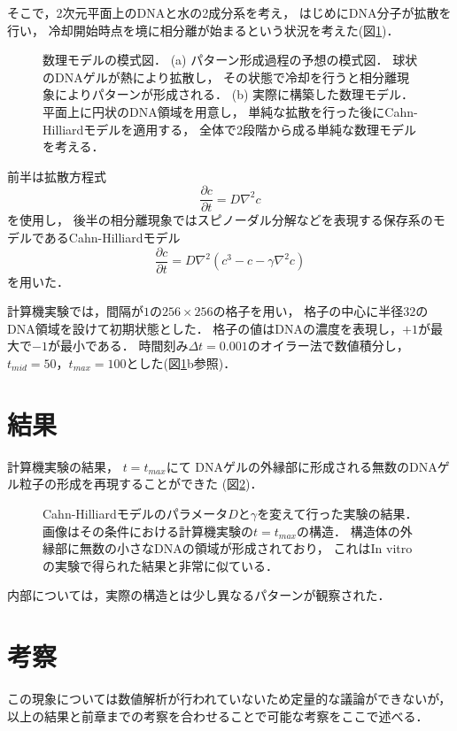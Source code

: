そこで，2次元平面上のDNAと水の2成分系を考え，
はじめにDNA分子が拡散を行い，
冷却開始時点を境に相分離が始まるという状況を考えた(図\ref{fig:model_cahn_hilliard})．
\begin{figure}
    \centering
    
    \caption{
        数理モデルの模式図．
        (a) パターン形成過程の予想の模式図．
            球状のDNAゲルが熱により拡散し，
            その状態で冷却を行うと相分離現象によりパターンが形成される．
        (b) 実際に構築した数理モデル．
            平面上に円状のDNA領域を用意し，
            単純な拡散を行った後にCahn-Hilliardモデルを適用する，
            全体で2段階から成る単純な数理モデルを考える．
    }
    \label{fig:model_cahn_hilliard}
\end{figure}
前半は拡散方程式
\begin{equation}
    \frac{\partial c}{\partial t}
    =
    D \nabla^{2} c
\end{equation}
を使用し，
後半の相分離現象ではスピノーダル分解などを表現する保存系のモデルであるCahn-Hilliardモデル
\begin{equation}
    \frac{\partial c}{\partial t}
    =
    D \nabla^{2} \left( c^3 - c - \gamma \nabla^{2} c \right)
\end{equation}
を用いた．

計算機実験では，間隔が$1$の$256\times 256$の格子を用い，
格子の中心に半径$32$のDNA領域を設けて初期状態とした．
格子の値はDNAの濃度を表現し，$+1$が最大で$-1$が最小である．
時間刻み$\Delta t=0.001$のオイラー法で数値積分し，$t_{mid}=50$，$t_{max}=100$とした(図\ref{fig:model_cahn_hilliard}b参照)．


\section{結果}
計算機実験の結果，
$t=t_{max}$にて
DNAゲルの外縁部に形成される無数のDNAゲル粒子の形成を再現することができた
(図\ref{fig:result_cahn_hilliard})．
\begin{figure}
    \centering
    
    \caption{
        Cahn-Hilliardモデルのパラメータ$D$と$\gamma$を変えて行った実験の結果．
        画像はその条件における計算機実験の$t=t_{max}$の構造．
        構造体の外縁部に無数の小さなDNAの領域が形成されており，
        これはIn vitroの実験で得られた結果と非常に似ている．
    }
    \label{fig:result_cahn_hilliard}
\end{figure}
内部については，実際の構造とは少し異なるパターンが観察された．


\section{考察}
この現象については数値解析が行われていないため定量的な議論ができないが，
以上の結果と前章までの考察を合わせることで可能な考察をここで述べる．

